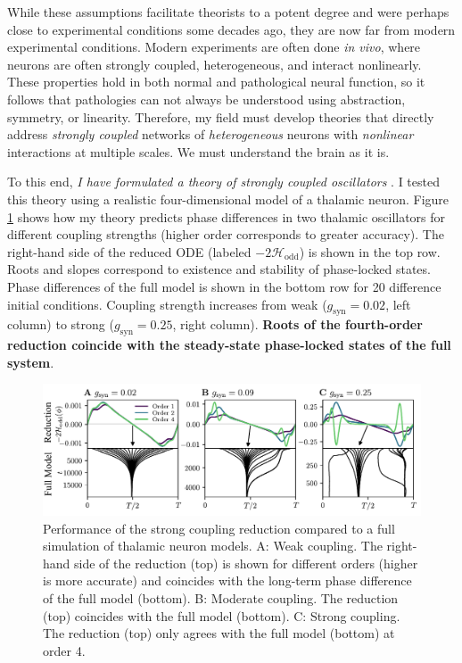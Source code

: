 \documentclass[a4paper,11pt]{article}
\newcommand{\h}{\mathcal{H}}
\begin{document}
While these assumptions facilitate theorists to a potent degree and were perhaps close to experimental conditions some decades ago, they are now far from modern experimental conditions. Modern experiments are often done \textit{in vivo}, where neurons are often strongly coupled, heterogeneous, and interact nonlinearly. These properties hold in both normal and pathological neural function, so it follows that pathologies can not always be understood using abstraction, symmetry, or linearity. Therefore, my field must develop theories that directly address \textit{strongly coupled} networks of \textit{heterogeneous} neurons with \textit{nonlinear} interactions at multiple scales. We must understand the brain as it is.

To this end, \textit{I have formulated a theory of strongly coupled oscillators} \cite{park2020high}. I tested this theory using a realistic four-dimensional model of a thalamic neuron. Figure \ref{fig:thal} shows how my theory predicts phase differences in two thalamic oscillators for different coupling strengths (higher order corresponds to greater accuracy). The right-hand side of the reduced ODE (labeled $-2\h_{\text{odd}}$) is shown in the top row. Roots and slopes correspond to existence and stability of phase-locked states. Phase differences of the full model is shown in the bottom row for 20 difference initial conditions. Coupling strength increases from weak ($g_\text{syn}=0.02$, left column) to strong ($g_\text{syn}=0.25$, right column). \textbf{Roots of the fourth-order reduction coincide with the steady-state phase-locked states of the full system}.

\begin{figure}[ht!]
	\centering
	\includegraphics[width=\textwidth]{figures/thal_h_edited.pdf}
	\caption{Performance of the strong coupling reduction compared to a full simulation of thalamic neuron models. A: Weak coupling. The right-hand side of the reduction (top) is shown for different orders (higher is more accurate) and coincides with the long-term phase difference of the full model (bottom). B: Moderate coupling. The reduction (top) coincides with the full model (bottom). C: Strong coupling. The reduction (top) only agrees with the full model (bottom) at order 4. }\label{fig:thal}
\end{figure}
\end{document}
